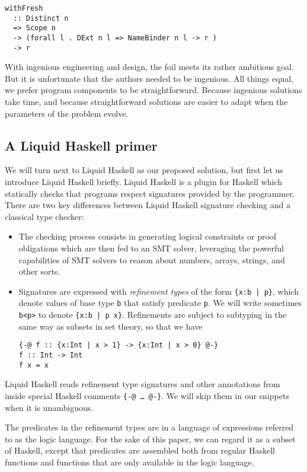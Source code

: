 \documentclass[sigconf]{acmart}
\newcommand{\tc}[1]{{\small\texttt{#1}}}
\begin{document}
\begin{verbatim}
withFresh
  :: Distinct n
  => Scope n
  -> (forall l . DExt n l => NameBinder n l -> r )
  -> r
\end{verbatim}

With ingenious engineering and design, the foil meets its rather ambitious goal.
But it is unfortunate that the authors needed to be ingenious. All things equal,
we prefer program components to be straightforward. Because ingenious solutions
take time, and because straightforward solutions are easier to adapt when the
parameters of the problem evolve.


\subsection{A Liquid Haskell primer}

We will turn next to Liquid Haskell as our proposed solution, but first let us
introduce Liquid Haskell briefly.
Liquid Haskell is a
plugin for Haskell which statically checks that programs respect signatures
provided by the programmer. There are two key differences between Liquid Haskell
signature checking and a classical type checker:

\begin{itemize}
  \item The checking process consists in generating logical constraints or proof
        obligations which are then fed to an SMT solver, leveraging the powerful
        capabilities of SMT solvers to reason about numbers, arrays, strings,
        and other sorts.
  \item Signatures are expressed with \emph{refinement types} of the form
        \tc{\{x:b | p\}}, which denote values of base type \tc{b} that
        satisfy predicate \tc{p}. We will write sometimes \tc{b<p>} to denote
        \tc{\{x:b | p x\}}.
Refinements are subject to subtyping in the same way as subsets in set
theory, so that we have
\begin{verbatim}
{-@ f :: {x:Int | x > 1} -> {x:Int | x > 0} @-}
f :: Int -> Int
f x = x
\end{verbatim}
\end{itemize}

Liquid Haskell reads refinement type signatures and other annotations from
inside special Haskell comments
\tc{\{-@ \ldots\ @-\}}. We will skip them in our snippets when it is unambiguous.

The predicates in the refinement types are in a language of expressions
referred to as the logic language. For the sake of this paper, we can
regard it as a subset of Haskell, except that predicates are assembled both from
regular Haskell functions and functions that are
only available in the logic language.
\end{document}
